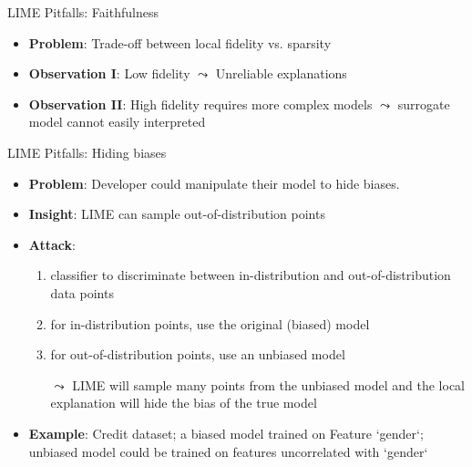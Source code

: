 \documentclass[11pt,compress,t,notes=noshow, aspectratio=169, xcolor=table]{beamer}
\begin{document}
\begin{vbframe}[c]{LIME Pitfalls: Faithfulness}
\begin{itemize}
	\item \textbf{Problem}: Trade-off between local fidelity vs. sparsity
	\item \textbf{Observation I}: Low fidelity $\leadsto$ Unreliable explanations
	\item \textbf{Observation II}: High fidelity requires more complex models $\leadsto$ surrogate model cannot easily interpreted
\end{itemize}

\end{vbframe}

\begin{vbframe}{LIME Pitfalls: Hiding biases }

\begin{itemize}
	\item \textbf{Problem}: Developer could manipulate their model to hide biases. 
	\item \textbf{Insight}: LIME can sample out-of-distribution points
	\item \textbf{Attack}:
	\begin{enumerate}
	    \item classifier to discriminate between in-distribution and out-of-distribution data points
	    \item for in-distribution points, use the original (biased) model
	    \item for out-of-distribution points, use an unbiased model 
	    \item[$\leadsto$] LIME will sample many points from the unbiased model and the local explanation will hide the bias of the true model
	\end{enumerate}
	\item \textbf{Example}: Credit dataset; a biased model trained on Feature `gender`; unbiased model could be trained on features uncorrelated with `gender`
\end{itemize}
\end{vbframe}
\end{document}
